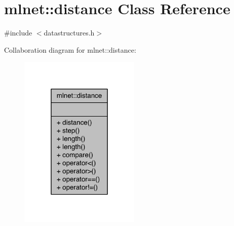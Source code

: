 \hypertarget{classmlnet_1_1distance}{\section{mlnet\+:\+:distance Class Reference}
\label{classmlnet_1_1distance}
}


{\ttfamily \#include $<$datastructures.\+h$>$}



Collaboration diagram for mlnet\+:\+:distance\+:
\nopagebreak
\begin{figure}[H]
\begin{center}
\leavevmode
\includegraphics[width=163pt]{classmlnet_1_1distance__coll__graph}
\end{center}
\end{figure}
